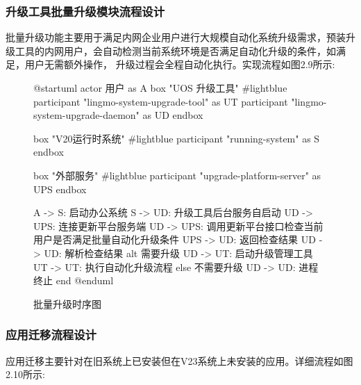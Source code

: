 \documentclass{utart}
\begin{document}
\subsubsection{升级工具批量升级模块流程设计}
批量升级功能主要用于满足内网企业用户进行大规模自动化系统升级需求，预装升级工具的内网用户，会自动检测当前系统环境是否满足自动化升级的条件，如满足，用户无需额外操作，
升级过程会全程自动化执行。实现流程如图2.9所示:
\begin{figure}[H]
    \centering
    \begin{plantuml}
        @startuml
        actor 用户 as A 
        box "UOS 升级工具" #lightblue
        participant "lingmo-system-upgrade-tool" as UT
        participant "lingmo-system-upgrade-daemon" as UD                             
        endbox

        box "V20运行时系统" #lightblue
        participant "running-system" as S
        endbox
        
        box "外部服务" #lightblue
        participant "upgrade-platform-server" as UPS
        endbox

        A -> S: 启动办公系统
        S -> UD: 升级工具后台服务自启动
        UD -> UPS: 连接更新平台服务端
        UD -> UPS: 调用更新平台接口检查当前用户是否满足批量自动化升级条件
        UPS -> UD: 返回检查结果
        UD -> UD: 解析检查结果
        alt 需要升级
        UD -> UT: 启动升级管理工具
        UT -> UT: 执行自动化升级流程
        else 不需要升级
        UD -> UD: 进程终止
        end        
        @enduml
    \end{plantuml}
    \caption{批量升级时序图}
    \label{fig:mulkupgrade}
\end{figure}

\subsubsection{应用迁移流程设计}
应用迁移主要针对在旧系统上已安装但在V23系统上未安装的应用。详细流程如图2.10所示:
\end{document}
